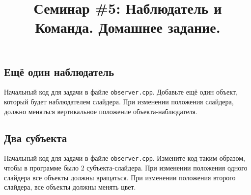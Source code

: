 \documentclass{article}
\begin{document}


\renewcommand{\thesubsection}{\arabic{subsection}}
\makeatletter
\def\@seccntformat#1{\@ifundefined{#1@cntformat}%
   {\csname the#1\endcsname\quad}%
   {\csname #1@cntformat\endcsname}}%
\newcommand\section@cntformat{}     %
\newcommand\subsection@cntformat{Задача \thesubsection.\space} %
\newcommand\subsubsection@cntformat{\thesubsubsection.\space} %
\makeatother

\title{Семинар \#5: Наблюдатель и Команда. Домашнее задание.\vspace{-5ex}}\date{}\maketitle


\subsection{Ещё один наблюдатель}
Начальный код для задачи в файле \texttt{observer.cpp}. Добавьте ещё один объект, который будет наблюдателем слайдера. При изменении положения слайдера, должно меняться вертикальное положение объекта-наблюдателя.


\subsection{Два субъекта}
Начальный код для задачи в файле \texttt{observer.cpp}.
Измените код таким образом, чтобы в программе было 2 субъекта-слайдера. При изменении положения одного слайдера все объекты должны вращаться. При изменении положения второго слайдера, все объекты должны менять цвет.
\end{document}

